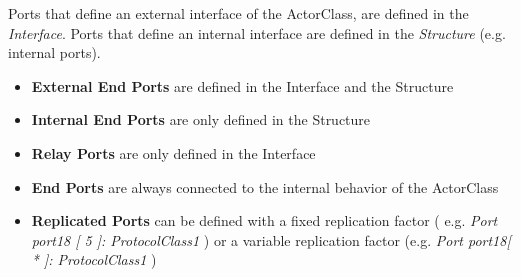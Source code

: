 Ports that define an external interface of the ActorClass, are defined in the \textit{Interface}. Ports 
that define an internal interface are defined in the \textit{Structure} (e.g. internal ports).
\begin{itemize}
\item \textbf{External End Ports} are defined in the Interface and the Structure
\item \textbf{Internal End Ports} are only defined in the Structure
\item \textbf{Relay Ports} are only defined in the Interface
\item \textbf{End Ports} are always connected to the internal behavior of the ActorClass
\item \textbf{Replicated Ports} can be defined with a fixed replication factor ( e.g. \textit{Port port18 
[ 5 ]: ProtocolClass1} ) or a variable replication factor (e.g. \textit{Port port18[ * ]: ProtocolClass1} )
\end{itemize}
